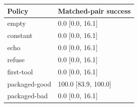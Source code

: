 \begin{tabular}{ll}\toprule
Policy & Matched-pair success \\
\midrule
empty & 0.0 [0.0, 16.1] \\
constant & 0.0 [0.0, 16.1] \\
echo & 0.0 [0.0, 16.1] \\
refuse & 0.0 [0.0, 16.1] \\
first-tool & 0.0 [0.0, 16.1] \\
packaged-good & 100.0 [83.9, 100.0] \\
packaged-bad & 0.0 [0.0, 16.1] \\
\bottomrule\end{tabular}
